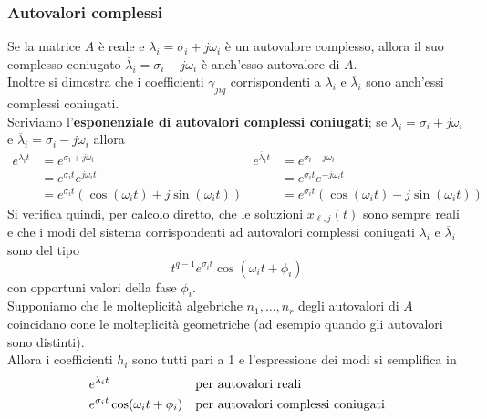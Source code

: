 \documentclass{article}
\numberwithin{equation}{subsection}
\begin{document}
\subsubsection{Autovalori complessi}
Se la matrice $A$ è reale e $\lambda_i = \sigma_i + j \omega_i$ è un autovalore complesso, allora il suo complesso coniugato $\overline{\lambda}_i = \sigma_i - j \omega_i$ è anch'esso autovalore di $A$.\\
Inoltre si dimostra che i coefficienti $\gamma_{jiq}$ corrispondenti a $\lambda_i$ e $\overline{\lambda}_i$ sono anch'essi complessi coniugati.\\
Scriviamo l'\textbf{esponenziale di autovalori complessi coniugati}; se $\lambda_i = \sigma_i + j \omega_i$ e $\overline{\lambda}_i = \sigma_i - j \omega_i$ allora
\begin{align*}
    e^{\lambda_i t} &= e^{\sigma_i + j \omega_i} & e^{\overline{\lambda}_i t} &= e^{\sigma_i - j \omega_i}\\
    &= e^{\sigma_i t} e^{j \omega_i t} & &= e^{\sigma_i t} e^{-j \omega_i t}\\
    &= e^{\sigma_i t} (\cos(\omega_i t) + j \sin(\omega_i t)) & &= e^{\sigma_i t} (\cos(\omega_i t) - j \sin(\omega_i t))
\end{align*}
Si verifica quindi, per calcolo diretto, che le soluzioni $x_{\ell,j}(t)$ sono sempre reali e che i modi del sistema corrispondenti ad autovalori complessi coniugati $\lambda_i$ e $\overline{\lambda}_i$ sono del tipo
\begin{equation}
    t^{q-1} e^{\sigma_i t} \cos (\omega_i t + \phi_i)
\end{equation}
con opportuni valori della fase $\phi_i$.
\vspace*{0.2cm}\\
Supponiamo che le molteplicità algebriche $n_1,...,n_r$ degli autovalori di $A$ coincidano cone le molteplicità geometriche (ad esempio quando gli autovalori sono distinti).\\
Allora i coefficienti $h_i$ sono tutti pari a 1 e l'espressione dei modi si semplifica in 
\begin{align*}
    &e^{\lambda_i t} & &\text{per autovalori reali}\\
    &e^{\sigma _i t} \cos (\omega_i t + \phi_i) & &\text{per autovalori complessi coniugati}
\end{align*}
\end{document}
